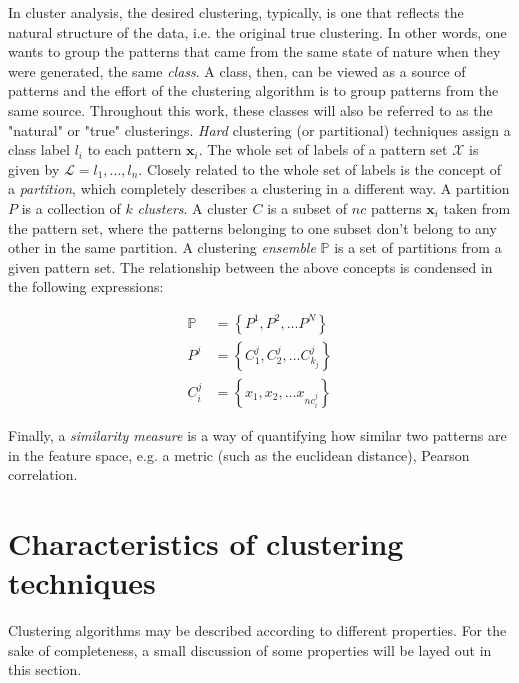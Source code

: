 In cluster analysis, the desired clustering, typically, is one that reflects the natural structure of the data, i.e. the original true clustering.
In other words, one wants to group the patterns that came from the same state of nature when they were generated, the same \emph{class}.
A class, then, can be viewed as a source of patterns and the effort of the clustering algorithm is to group patterns from the same source.
Throughout this work, these classes will also be referred to as the "natural" or "true" clusterings.
\emph{Hard} clustering (or partitional) techniques assign a class label $l_i$ to each pattern $\mathbf{x}_i$.
The whole set of labels of a pattern set $\mathcal{X}$ is given by $\mathcal{L} = {l_1, \ldots, l_n}$.
Closely related to the whole set of labels is the concept of a \emph{partition}, which completely describes a clustering in a different way.
A partition $P$ is a collection of $k$ \emph{clusters}.
A cluster $C$ is a subset of $nc$ patterns $\mathbf{x}_i$ taken from the pattern set, where the patterns belonging to one subset don't belong to any other in the same partition.
A clustering \emph{ensemble} $\mathbb{P}$ is a set of partitions from a given pattern set.
The relationship between the above concepts is condensed in the following expressions:

\begin{align}
    \mathbb{P} &= \left \{   P^1, P^2, \ldots P^N   \right \}  \label{eq:ensemble} \\
    P^j &= \left \{   C^j_1, C^j_2, \ldots C^{j}_{k_j}   \right \}  \label{eq:partition} \\
    C^j_i &= \left \{   x_1, x_2, \ldots x_{nc^j_i}   \right \} \label{eq:cluster}
\end{align}


Finally, a \emph{similarity measure} is a way of quantifying how similar two patterns are in the feature space, e.g. a metric (such as the euclidean distance), Pearson correlation.%

\section{Characteristics of clustering techniques}

Clustering algorithms may be described according to different properties.
For the sake of completeness, a small discussion of some properties will be layed out in this section.

